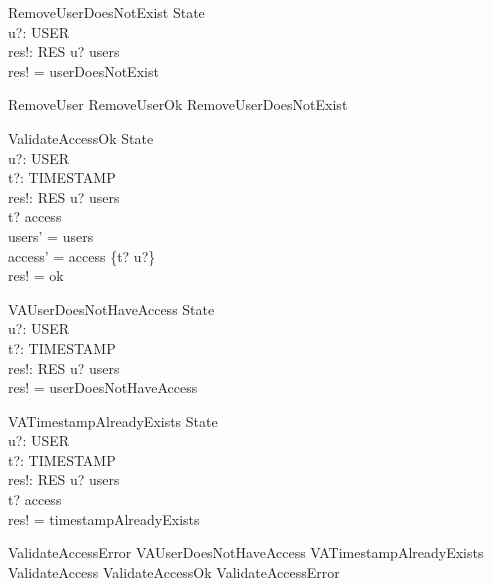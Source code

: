 \begin{schema}{RemoveUserDoesNotExist}
    \Xi State \\
    u?: USER \\
    res!: RES
    \where
    u? \notin users \\
    res! = userDoesNotExist
\end{schema}

\begin{zed}
    RemoveUser  RemoveUserOk \lor RemoveUserDoesNotExist
\end{zed}

\begin{schema}{ValidateAccessOk}
    \Delta State \\
    u?: USER \\
    t?: TIMESTAMP \\
    res!: RES
    \where
    u? \in users \\
    t? \notin \dom access \\
    users' = users \\
    access' = access \cup \{t? \mapsto u?\} \\
    res! = ok
\end{schema}

\begin{schema}{VAUserDoesNotHaveAccess}
    \Xi State \\
    u?: USER \\
    t?: TIMESTAMP \\
    res!: RES
    \where
    u? \notin users \\
    res! = userDoesNotHaveAccess
\end{schema}

\begin{schema}{VATimestampAlreadyExists}
    \Xi State \\
    u?: USER \\
    t?: TIMESTAMP \\
    res!: RES
    \where
    u? \in users \\
    t? \in \dom access \\
    res! = timestampAlreadyExists
\end{schema}

\begin{zed}
    ValidateAccessError  VAUserDoesNotHaveAccess \lor VATimestampAlreadyExists \\
    ValidateAccess  ValidateAccessOk \lor ValidateAccessError
\end{zed}

